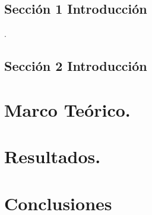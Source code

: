 \documentclass[a4paper,12pt]{report}
\begin{document}
\section*{Sección 1 Introducción } 
{} %
. 

\section*{Sección 2 Introducción}
{} %


\clearpage %



\chapter{Marco Teórico.}\label{Cap1} %


\chapter{Resultados.}\label{Cap2}%


\cleardoublepage

\chapter*{Conclusiones} %
{} %


\cleardoublepage
{}
{} %
\renewcommand{\bibname}{Bibliografía} %
\end{document}
